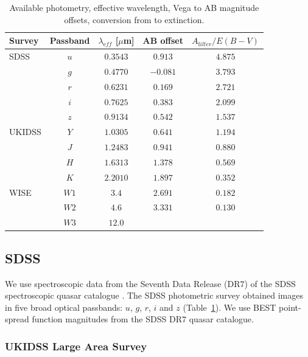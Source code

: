 \begin{table}
  \footnotesize
  \centering
  \begin{tabular}{lcccc}
    \hline 
    Survey & Passband & $\lambda_{\mathrm eff}$ [$\mu$m] & AB offset & $A_{\mathrm filter}/E(B-V)$ \\
    \hline 
    SDSS & $u$ & $0.3543$ & $ 0.913$ & $4.875$ \\
         & $g$ & $0.4770$ & $-0.081$ & $3.793$ \\
         & $r$ & $0.6231$ & $ 0.169$ & $2.721$ \\
         & $i$ & $0.7625$ & $ 0.383$ & $2.099$ \\
         & $z$ & $0.9134$ & $ 0.542$ & $1.537$ \\
    UKIDSS & $Y$ & $1.0305$ &  $0.641$ & $1.194$ \\
           & $J$ & $1.2483$ &  $0.941$ & $0.880$ \\
           & $H$ & $1.6313$ &  $1.378$ & $0.569$ \\
           & $K$ & $2.2010$ &  $1.897$ & $0.352$ \\
    WISE & $W1$ & $3.4$ & $2.691$ & $0.182$\\
         & $W2$ & $4.6$ & $3.331$ & $0.130$\\
         & $W3$ & $12.0$ & & \\           
    \hline
  \end{tabular}
  \caption[{Available photometry, effective wavelength, Vega to AB magnitude offsets, conversion from \ebv to extinction.}]{Available photometry, effective wavelength, Vega to AB magnitude offsets, conversion from \ebv to extinction. }
  \label{tab:photometry}
\end{table}

\subsection{SDSS}

We use spectroscopic data from the Seventh Data Release (DR$7$) of the SDSS spectroscopic quasar catalogue \citep{schneider10}.
The SDSS photometric survey obtained images in five broad optical passbands: $u$, $g$, $r$, $i$ and $z$ (Table~\ref{tab:photometry}).  
We use BEST point-spread function magnitudes from the SDSS DR$7$ quasar catalogue.

\subsubsection{UKIDSS Large Area Survey}

